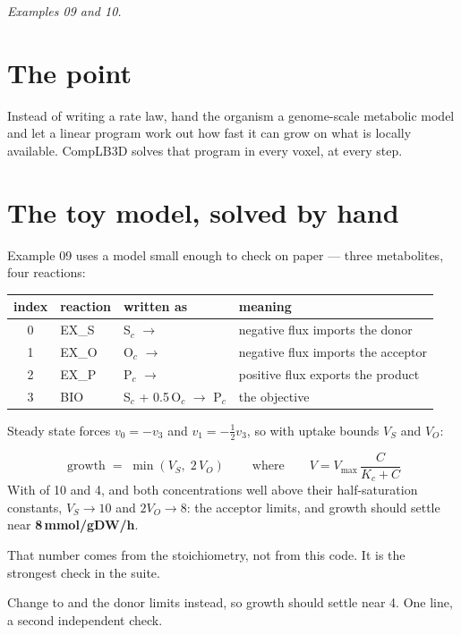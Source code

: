 \emph{Examples 09 and 10.}

\section{The point}

Instead of writing a rate law, hand the organism a genome-scale metabolic model
and let a linear program work out how fast it can grow on what is locally
available. CompLB3D solves that program in every voxel, at every step.

\section{The toy model, solved by hand}

Example 09 uses a model small enough to check on paper --- three metabolites,
four reactions:

\begin{center}
\begin{tabular}{@{}clll@{}}
\toprule
\textbf{index} & \textbf{reaction} & \textbf{written as} & \textbf{meaning}\\
\midrule
0 & EX\_S & S$_c$ $\rightarrow$ & negative flux imports the donor\\
1 & EX\_O & O$_c$ $\rightarrow$ & negative flux imports the acceptor\\
2 & EX\_P & P$_c$ $\rightarrow$ & positive flux exports the product\\
3 & BIO   & S$_c$ + 0.5\,O$_c$ $\rightarrow$ P$_c$ & the objective\\
\bottomrule
\end{tabular}
\end{center}

Steady state forces $v_0 = -v_3$ and $v_1 = -\tfrac12 v_3$, so with uptake
bounds $V_S$ and $V_O$:

\begin{cbnote}
\[
  \boxed{\ \text{growth} \;=\; \min\!\left(V_S,\; 2\,V_O\right)\ }
  \qquad\text{where}\qquad
  V = V_{\max}\,\frac{C}{K_c + C}
\]
With  of 10 and 4, and both concentrations
well above their half-saturation constants, $V_S \to 10$ and $2V_O \to 8$: the
acceptor limits, and growth should settle near \textbf{8\,mmol/gDW/h}.

That number comes from the stoichiometry, not from this code. It is the
strongest check in the suite.
\end{cbnote}

Change  to  and the donor limits
instead, so growth should settle near 4. One line, a second independent check.

